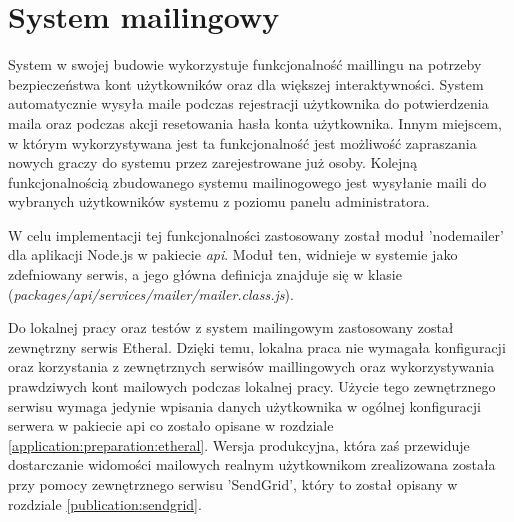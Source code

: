 \label{section:mailling}
\section{System mailingowy}
System w swojej budowie wykorzystuje funkcjonalność maillingu na potrzeby bezpieczeństwa kont użytkowników oraz dla większej interaktywności. System automatycznie wysyła maile podczas rejestracji użytkownika do potwierdzenia maila oraz podczas akcji resetowania hasła konta użytkownika. Innym miejscem, w którym wykorzystywana jest ta funkcjonalność jest możliwość zapraszania nowych graczy do systemu przez zarejestrowane już osoby. Kolejną funkcjonalnością zbudowanego systemu mailinogowego jest wysyłanie maili do wybranych użytkowników systemu z poziomu panelu administratora.

W celu implementacji tej funkcjonalności zastosowany został moduł 'nodemailer' dla aplikacji Node.js w pakiecie \textit{api}. Moduł ten, widnieje w systemie jako zdefniowany serwis, a jego główna definicja znajduje się w klasie (\textit{packages/api/services/mailer/mailer.class.js}).

Do lokalnej pracy oraz testów z system mailingowym zastosowany został zewnętrzny serwis Etheral. Dzięki temu, lokalna praca nie wymagała konfiguracji oraz korzystania z zewnętrznych serwisów maillingowych oraz wykorzystywania prawdziwych kont mailowych podczas lokalnej pracy. Użycie tego zewnętrznego serwisu wymaga jedynie wpisania danych użytkownika w ogólnej konfiguracji serwera w pakiecie api co zostało opisane w rozdziale \ref{application:preparation:etheral}. Wersja produkcyjna, która zaś przewiduje dostarczanie widomości mailowych realnym użytkownikom zrealizowana została przy pomocy zewnętrznego serwisu 'SendGrid', który to został opisany w rozdziale \ref{publication:sendgrid}.
